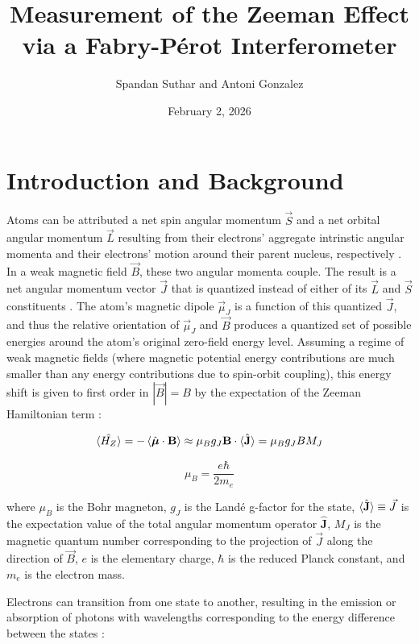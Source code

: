 \documentclass[11pt]{article}
\title{Measurement of the Zeeman Effect via a Fabry-Pérot Interferometer}
\author{Spandan Suthar and Antoni Gonzalez}
\date{February 2, 2026}
\begin{document}
\maketitle

\section{Introduction and Background}

Atoms can be attributed a net spin angular momentum $\vec S$ and a net orbital angular momentum $\vec L$ resulting from their electrons' aggregate intrinstic angular momenta and their electrons' motion around their parent nucleus, respectively \cite{harris, qmech,griffiths_qm}. In a weak magnetic field $\vec B$, these two angular momenta couple. The result is a net angular momentum vector $\vec J$ that is quantized instead of either of its $\vec L$ and $\vec S$ constituents \cite{harris, qmech,griffiths_qm}. The atom's magnetic dipole $\vec \mu_J$ is a function of this quantized $\vec J$, and thus the relative orientation of $\vec \mu_J$ and $\vec B$ produces a quantized set of possible energies around the atom's original zero-field energy level\cite{harris, qmech,griffiths_qm}. Assuming a regime of weak magnetic fields (where magnetic potential energy contributions are much smaller than any energy contributions due to spin-orbit coupling), this energy shift is given to first order in $|\vec B| =B$ by the expectation of the Zeeman Hamiltonian term  \cite{qmech,griffiths_qm}:

\begin{equation}
\braket{\hat {H_Z}} = -\braket{\hat {\boldsymbol \mu} \cdot {\mathbf B} } \approx \mu_B g_J \mathbf B \cdot \braket{\hat {\mathbf J}} = \mu_B g_J B M_J
\label{eq:H_zeeman}
\end{equation}

\begin{equation}
    \mu_B = \frac{e\hbar}{2m_e}
\label{eq:magneton}
\end{equation}

where $\mu_B$ is the Bohr magneton, $g_J$ is the Landé g-factor for the state, $\braket{\hat {\mathbf J}} \equiv \vec J$ is the expectation value of the total angular momentum operator $\hat {\boldsymbol J}$, $M_J$ is the magnetic quantum number corresponding to the projection of $\vec J$ along the direction of $\vec B$, $e$ is the elementary charge, $\hbar$ is the reduced Planck constant, and $m_e$ is the electron mass.

Electrons can transition from one state to another, resulting in the emission or absorption of photons with wavelengths corresponding to the energy difference between the states \cite{harris}:
\end{document}
